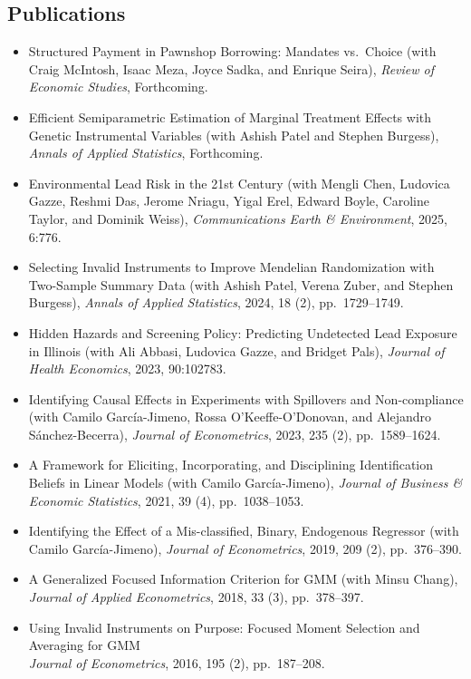 \documentclass[line,overlapped]{myres}
\begin{document}
\begin{resume}
\section{\sc Publications}
\begin{itemize}
  \item Structured Payment in Pawnshop Borrowing: Mandates vs.\ Choice (with Craig McIntosh, Isaac Meza, Joyce Sadka, and Enrique Seira), \emph{Review of Economic Studies}, Forthcoming.
  \item Efficient Semiparametric Estimation of Marginal Treatment Effects with Genetic Instrumental Variables (with Ashish Patel and Stephen Burgess), \emph{Annals of Applied Statistics}, Forthcoming.
  \item Environmental Lead Risk in the 21st Century (with Mengli Chen, Ludovica Gazze, Reshmi Das, Jerome Nriagu, Yigal Erel, Edward Boyle, Caroline Taylor, and Dominik Weiss), \emph{Communications Earth \& Environment}, 2025, 6:776.
  \item Selecting Invalid Instruments to Improve Mendelian Randomization with Two-Sample Summary Data (with Ashish Patel, Verena Zuber, and Stephen Burgess), \emph{Annals of Applied Statistics}, 2024, 18 (2), pp.\ 1729--1749.
  \item Hidden Hazards and Screening Policy: Predicting Undetected Lead Exposure in Illinois (with Ali Abbasi, Ludovica Gazze, and Bridget Pals), \emph{Journal of Health Economics}, 2023, 90:102783.
  \item Identifying Causal Effects in Experiments with Spillovers and Non-compliance (with Camilo Garc\'{i}a-Jimeno, Rossa O'Keeffe-O'Donovan, and Alejandro S\'anchez-Becerra), \emph{Journal of Econometrics}, 2023, 235 (2), pp.\ 1589--1624.
    \item A Framework for Eliciting, Incorporating, and Disciplining Identification Beliefs in Linear Models (with Camilo Garc\'{i}a-Jimeno), \emph{Journal of Business \& Economic Statistics}, 2021, 39 (4), pp.\ 1038--1053.
  \item Identifying the Effect of a Mis-classified, Binary, Endogenous Regressor (with Camilo Garc\'{i}a-Jimeno), \emph{Journal of Econometrics}, 2019, 209 (2), pp.\ 376--390.
  \item A Generalized Focused Information Criterion for GMM (with Minsu Chang), \emph{Journal of Applied Econometrics}, 2018, 33 (3), pp.\ 378--397.
  \item Using Invalid Instruments on Purpose: Focused Moment Selection and Averaging for GMM\\ \emph{Journal of Econometrics}, 2016, 195 (2), pp.\ 187--208.

\end{itemize}
\end{resume}
\end{document}
